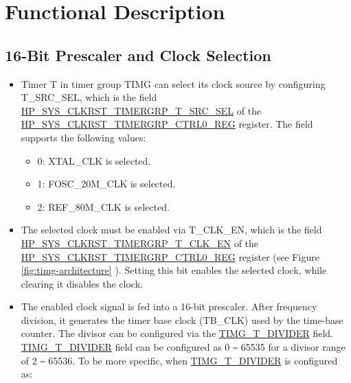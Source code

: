 \documentclass[main\_\_EN.tex]{subfiles}
\begin{document}
\section{Functional Description}
\label{sec:timg-func-descr}

\subsection{16-Bit Prescaler and Clock Selection}

\begin{itemize}
    \item Timer T in timer group TIMG can select its clock source by configuring T\_SRC\_SEL, which is the field \hyperref[fielddesc:HPSYSCLKRSTTIMERGRPNTXSRCSEL]{HP\_SYS\_CLKRST\_TIMERGRP\_T\_SRC\_SEL} of the \hyperref[regdesc:HPSYSCLKRSTTIMERGRPNCTRL0REG]{HP\_SYS\_CLKRST\_TIMERGRP\_CTRL0\_REG} register. The field supports the following values:

    \begin{itemize}
    \item 0: XTAL\_CLK is selected.
    \item 1: FOSC\_20M\_CLK is selected.
    \item 2: REF\_80M\_CLK is selected.
    \end{itemize}

    \item The selected clock must be enabled via T\_CLK\_EN, which is the field \hyperref[fielddesc:HPSYSCLKRSTTIMERGRPNTXCLKEN]{HP\_SYS\_CLKRST\_TIMERGRP\_T\_CLK\_EN} of the \hyperref[regdesc:HPSYSCLKRSTTIMERGRPNCTRL0REG]{HP\_SYS\_CLKRST\_TIMERGRP\_CTRL0\_REG} register (see Figure \ref{fig:timg-architecture} \textit{}). Setting this bit enables the selected clock, while clearing it disables the clock.
    
    \item The enabled clock signal is fed into a 16-bit prescaler. After frequency division, it generates the timer base clock (TB\_CLK) used by the time-base counter. The divisor can be configured via the \hyperref[fielddesc:TIMGTXDIVIDER]{TIMG\_T\_DIVIDER} field. \hyperref[fielddesc:TIMGTXDIVIDER]{TIMG\_T\_DIVIDER} field can be configured as 0 \verb+~+ 65535 for a divisor range of 2 \verb+~+ 65536. To be more specific, when \hyperref[fielddesc:TIMGTXDIVIDER]{TIMG\_T\_DIVIDER} is configured as:


\end{itemize}
\end{document}
